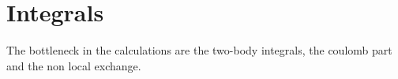 \documentclass[12pt,a4paper,english]{beamer}
\newcommand{\braopket}[3]{\langle #1|#2|#3\rangle}
\begin{document}
\section{Integrals}
\begin{frame}
  The bottleneck in the calculations are the two-body integrals, the coulomb part and the non local exchange. 

\end{frame}


%
%
%
%  
%  
%
%
%

%
%
%  
\end{document}
